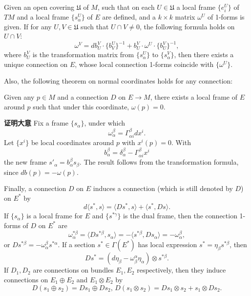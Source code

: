 \begin{theorem}{}
Given an open covering $\mathfrak{U}$ of $M$, such that on each $U\in\mathfrak{U}$ a local frame $\{e^U_i\}$ of $TM$ and a local frame $\{s^U_\alpha\}$ of $E$ are defined, and a $k\times k$ matrix $\omega^U$ of 1-forms is given. If for any $U,V\in\mathfrak{U}$ such that $U\cap V\neq0$, the following formula holds on $U\cap V$:
$$\omega^V=db^V_U\cdot \{b_V^U\}^{-1}+b^V_U\cdot\omega^U\cdot \{b^V_U\}^{-1},$$
where $b^V_U$ is the transformation matrix from $\{s^U_\alpha\}$ to $\{s^V_\alpha\}$, then there exists a unique connection on $E$, whose local connection 1-forms coincide with $\{\omega^U\}$.
\end{theorem}

Also, the following theorem on normal coordinates holds for any connection:

\begin{theorem}{}
Given any $p\in M$ and a connection $D$ on $E\to M$, there exists a local frame of $E$ around $p$ such that under this coordinate, $\omega(p)=0$.
\end{theorem}
\textbf{证明大意} Fix a frame $\{s_\alpha\}$, under which
$$\omega^\beta_\alpha=\Gamma_{\alpha i}^\beta dx^i.$$
Let $\{x^i\}$ be local coordinates around $p$ with $x^i(p)=0$. With
$$b_\alpha^\beta=\delta_\alpha^\beta-\Gamma_{\alpha i}^\beta x^i$$
the new frame $s'_\alpha=b_\alpha^\beta s_\beta$. The result follows from the transformation formula, since $db(p)=-\omega(p)$.

Finally, a connection $D$ on $E$ induces a connection (which is still denoted by $D$) on $E^*$ by
$$d\langle s^*,s\rangle=\langle Ds^*,s\rangle+\langle s^*,Ds\rangle.$$
If $\{s_\alpha\}$ is a local frame for $E$ and $\{s^{*\gamma}\}$ is the dual frame, then the connection 1-forms of $D$ on $E^*$ are
$$\omega^{*\beta}_\alpha=\langle Ds^{*\beta},s_\alpha\rangle=-\langle s^{*\beta},Ds_\alpha\rangle=-\omega^\beta_\alpha,$$
or $Ds^{*\beta}=-\omega^\beta_\alpha s^{*\alpha}$. If a section $s^*\in\Gamma(E^*)$ has local expression $s^*=\eta_\beta s^{*\beta}$, then
$$Ds^*=(d\eta_\beta-\omega_\beta^\alpha\eta_\alpha)\otimes s^{*\beta}.$$
If $D_1,D_2$ are connections on bundles $E_1,E_2$ respectively, then they induce connections on $E_1\oplus E_2$ and $E_1\otimes E_2$ by
$$D(s_1\oplus s_2)=Ds_1\oplus Ds_2,\,D(s_1\otimes s_2)=Ds_1\otimes s_2+s_1\otimes Ds_2.$$